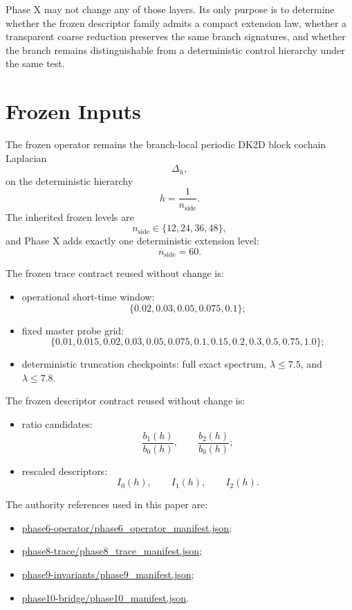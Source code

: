\documentclass[11pt]{article}
\begin{document}
Phase X may not change any of those layers. Its only purpose is to determine whether the frozen descriptor family admits a compact extension law, whether a transparent coarse reduction preserves the same branch signatures, and whether the branch remains distinguishable from a deterministic control hierarchy under the same test.

\section{Frozen Inputs}

The frozen operator remains the branch-local periodic DK2D block cochain Laplacian
\[
\Delta_h,
\]
on the deterministic hierarchy
\[
h = \frac{1}{n_{\mathrm{side}}}.
\]
The inherited frozen levels are
\[
n_{\mathrm{side}} \in \{12,24,36,48\},
\]
and Phase X adds exactly one deterministic extension level:
\[
n_{\mathrm{side}} = 60.
\]

The frozen trace contract reused without change is:
\begin{itemize}
\item operational short-time window:
\[
\{0.02, 0.03, 0.05, 0.075, 0.1\};
\]
\item fixed master probe grid:
\[
\{0.01,0.015,0.02,0.03,0.05,0.075,0.1,0.15,0.2,0.3,0.5,0.75,1.0\};
\]
\item deterministic truncation checkpoints: full exact spectrum, $\lambda \le 7.5$, and $\lambda \le 7.8$.
\end{itemize}

The frozen descriptor contract reused without change is:
\begin{itemize}
\item ratio candidates:
\[
\frac{b_1(h)}{b_0(h)}, \qquad \frac{b_2(h)}{b_0(h)};
\]
\item rescaled descriptors:
\[
I_0(h), \qquad I_1(h), \qquad I_2(h).
\]
\end{itemize}

The authority references used in this paper are:
\begin{itemize}
\item \url{phase6-operator/phase6_operator_manifest.json};
\item \url{phase8-trace/phase8_trace_manifest.json};
\item \url{phase9-invariants/phase9_manifest.json};
\item \url{phase10-bridge/phase10_manifest.json}.
\end{itemize}
\end{document}
